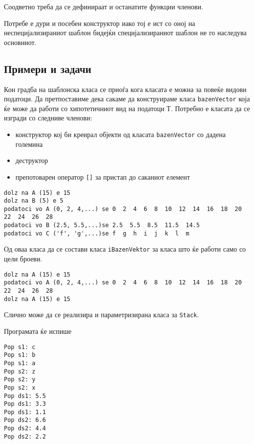 Соодветно треба да се дефинираат и останатите функции членови.

Потребе е дури и посебен конструктор иако тој е ист со оној на
неспецијализираниот шаблон бидејќи специјализираниот шаблон не го наследува
основниот.
	


\subsection{Примери и задачи}
Кон градба на шаблонска класа се приоѓа кога класата е можна за повеќе видови
податоци. Да претпоставиме дека сакаме да конструираме класа
\texttt{bazenVector} која ќе може да работи со хипотетичниот вид на податоци Т. Потребно е класата да
се изгради со следниве членови:

\begin{itemize}
  \item конструктор кој би креирал објекти од класата \texttt{bazenVector} со
  дадена големина
  \item деструктор
  \item препотоварен оператор \texttt{[]} за пристап до саканиот елемент
\end{itemize}



\begin{verbatim}
dolz na A (15) e 15
dolz na B (5) e 5
podatoci vo A (0, 2, 4,...) se 0  2  4  6  8  10  12  14  16  18  20  22  24  26  28  
podatoci vo B (2.5, 5.5,...)se 2.5  5.5  8.5  11.5  14.5  
podatoci vo C ('f', 'g',...)se f  g  h  i  j  k  l  m
\end{verbatim}

Од оваа класа да се состави класа \texttt{iBazenVektor} за класа што ќе работи
само со цели броеви.



\begin{verbatim}
dolz na A (15) e 15
podatoci vo A (0, 2, 4,...) se 0  2  4  6  8  10  12  14  16  18  20  22  24  26  28
dolz na A (15) e 15
\end{verbatim}

Слично може да се реализира и параметризирана класа за \texttt{Stack}.



Програмата ќе испише
\begin{verbatim}
Pop s1: c
Pop s1: b
Pop s1: a
Pop s2: z
Pop s2: y
Pop s2: x
Pop ds1: 5.5
Pop ds1: 3.3
Pop ds1: 1.1
Pop ds2: 6.6
Pop ds2: 4.4
Pop ds2: 2.2
\end{verbatim}

